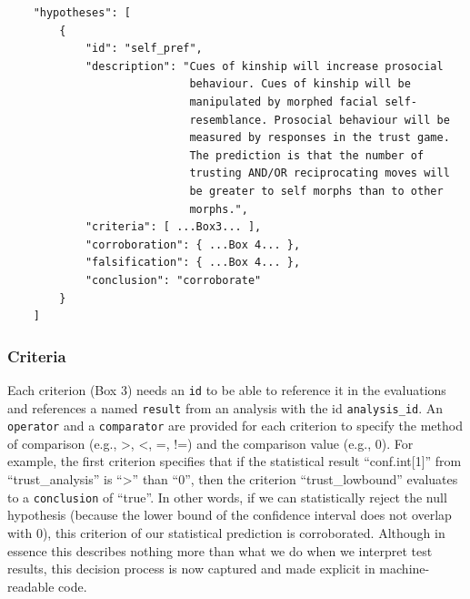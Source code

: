 \documentclass[english,doc,floatsintext]{apa6}
\begin{document}
\begin{tcolorbox}[colback=black!5!white,colframe=white!5!black,title=Box 2. The hypothesis component.]
\begin{verbatim}
    "hypotheses": [
        {
            "id": "self_pref",
            "description": "Cues of kinship will increase prosocial
                            behaviour. Cues of kinship will be
                            manipulated by morphed facial self-
                            resemblance. Prosocial behaviour will be
                            measured by responses in the trust game.
                            The prediction is that the number of
                            trusting AND/OR reciprocating moves will 
                            be greater to self morphs than to other
                            morphs.",
            "criteria": [ ...Box3... ],
            "corroboration": { ...Box 4... },
            "falsification": { ...Box 4... },
            "conclusion": "corroborate"
        }
    ]
\end{verbatim}
\end{tcolorbox}

\hypertarget{criteria}{%
\subsubsection{Criteria}\label{criteria}}

Each criterion (Box 3) needs an \texttt{id} to be able to reference it in the evaluations and references a named \texttt{result} from an analysis with the id \texttt{analysis\_id}. An \texttt{operator} and a \texttt{comparator} are provided for each criterion to specify the method of comparison (e.g., \textgreater{}, \textless{}, =, !=) and the comparison value (e.g., 0). For example, the first criterion specifies that if the statistical result \enquote{conf.int{[}1{]}} from \enquote{trust\_analysis} is \enquote{\textgreater{}} than \enquote{0}, then the criterion \enquote{trust\_lowbound} evaluates to a \texttt{conclusion} of \enquote{true}. In other words, if we can statistically reject the null hypothesis (because the lower bound of the confidence interval does not overlap with 0), this criterion of our statistical prediction is corroborated. Although in essence this describes nothing more than what we do when we interpret test results, this decision process is now captured and made explicit in machine-readable code.
\end{document}
